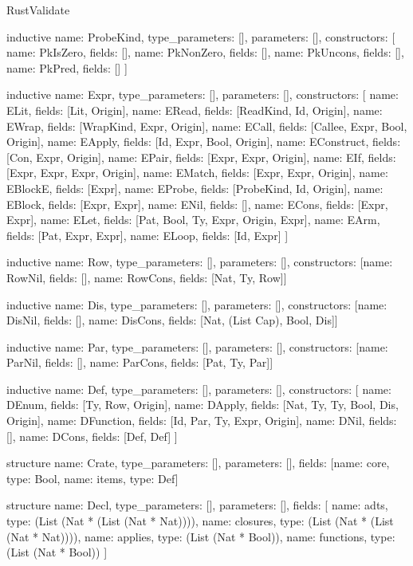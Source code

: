 \begin{lexlean}{RustValidate}
\begin{semanticmodule}
inductive{
  name: ProbeKind,
  type_parameters: [],
  parameters: [],
  constructors: [
    {name: PkIsZero, fields: []},
    {name: PkNonZero, fields: []},
    {name: PkUncons, fields: []},
    {name: PkPred, fields: []}
  ]
}

inductive{
  name: Expr,
  type_parameters: [],
  parameters: [],
  constructors: [
    {name: ELit, fields: [Lit, Origin]},
    {name: ERead, fields: [ReadKind, Id, Origin]},
    {name: EWrap, fields: [WrapKind, Expr, Origin]},
    {name: ECall, fields: [Callee, Expr, Bool, Origin]},
    {name: EApply, fields: [Id, Expr, Bool, Origin]},
    {name: EConstruct, fields: [Con, Expr, Origin]},
    {name: EPair, fields: [Expr, Expr, Origin]},
    {name: EIf, fields: [Expr, Expr, Expr, Origin]},
    {name: EMatch, fields: [Expr, Expr, Origin]},
    {name: EBlockE, fields: [Expr]},
    {name: EProbe, fields: [ProbeKind, Id, Origin]},
    {name: EBlock, fields: [Expr, Expr]},
    {name: ENil, fields: []},
    {name: ECons, fields: [Expr, Expr]},
    {name: ELet, fields: [Pat, Bool, Ty, Expr, Origin, Expr]},
    {name: EArm, fields: [Pat, Expr, Expr]},
    {name: ELoop, fields: [Id, Expr]}
  ]
}

inductive{
  name: Row,
  type_parameters: [],
  parameters: [],
  constructors: [{name: RowNil, fields: []}, {name: RowCons, fields: [Nat, Ty, Row]}]
}

inductive{
  name: Dis,
  type_parameters: [],
  parameters: [],
  constructors: [{name: DisNil, fields: []}, {name: DisCons, fields: [Nat, (List Cap), Bool, Dis]}]
}

inductive{
  name: Par,
  type_parameters: [],
  parameters: [],
  constructors: [{name: ParNil, fields: []}, {name: ParCons, fields: [Pat, Ty, Par]}]
}

inductive{
  name: Def,
  type_parameters: [],
  parameters: [],
  constructors: [
    {name: DEnum, fields: [Ty, Row, Origin]},
    {name: DApply, fields: [Nat, Ty, Ty, Bool, Dis, Origin]},
    {name: DFunction, fields: [Id, Par, Ty, Expr, Origin]},
    {name: DNil, fields: []},
    {name: DCons, fields: [Def, Def]}
  ]
}

structure{
  name: Crate,
  type_parameters: [],
  parameters: [],
  fields: [{name: core, type: Bool}, {name: items, type: Def}]
}

structure{
  name: Decl,
  type_parameters: [],
  parameters: [],
  fields: [
    {name: adts, type: (List (Nat * (List (Nat * Nat))))},
    {name: closures, type: (List (Nat * (List (Nat * Nat))))},
    {name: applies, type: (List (Nat * Bool))},
    {name: functions, type: (List (Nat * Bool))}
  ]
}


\end{semanticmodule}
\end{lexlean}
